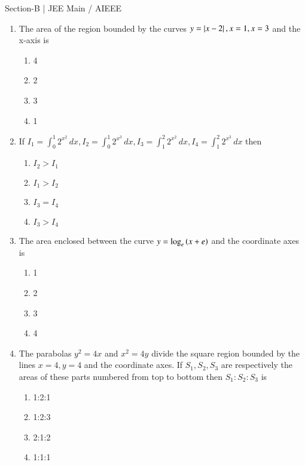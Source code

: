 \documentclass[journal]{IEEEtran}
\begin{document}
\bigskip
Section-B | JEE Main / AIEEE
	\begin{enumerate}
    [start=16]
	      \item 
		The area of the region bounded by the curves $y=\left\vert x-2\right\vert, x=1, x=3$ and the x-axis is \quad \quad \quad
        \quad \quad \hfill {}
		     \begin{enumerate}
		              \item 4
		              \item 2
		              \item 3
		              \item 1
		     \end{enumerate}     
	      \item
           If $I_1=\int_{0}^{1} 2^{x^{2}} \,dx,I_2=\int_{0}^{1} 2^{x^{3}} \,dx,I_3=\int_{1}^{2} 2^{x^{2}} \,dx, I_4=\int_{1}^{2} 2^{x^{3}} \, dx
          $ then 
          \hfill {} 
          \begin{enumerate}
                   \item $I_2>I_1$
                   \item $I_1>I_2$
                   \item $I_3=I_4$
                   \item $I_3>I_4$
          \end{enumerate}
	      \item
		      The area enclosed between the curve $y=\log_e\left(x+e\right)$ and the coordinate  axes is 
		     \hfill {} 
		     \begin{enumerate}
		              \item 1
		              \item 2
		              \item 3
		              \item 4
		     \end{enumerate}
	      \item 
		      The parabolas $y^{2}=4x$ and $x^{2}=4y$ divide the square region bounded by the lines $x=4, y=4$ and the coordinate axes. If $S_1, S_2, S_3$ are respectively the areas of these parts numbered from top to bottom then $S_1:S_2:S_3$ is
		     \hfill {} 
		     \begin{enumerate}
		             \item 1:2:1
		             \item 1:2:3
		             \item 2:1:2
		             \item 1:1:1
		     \end{enumerate}  

\end{enumerate}
\end{document}
